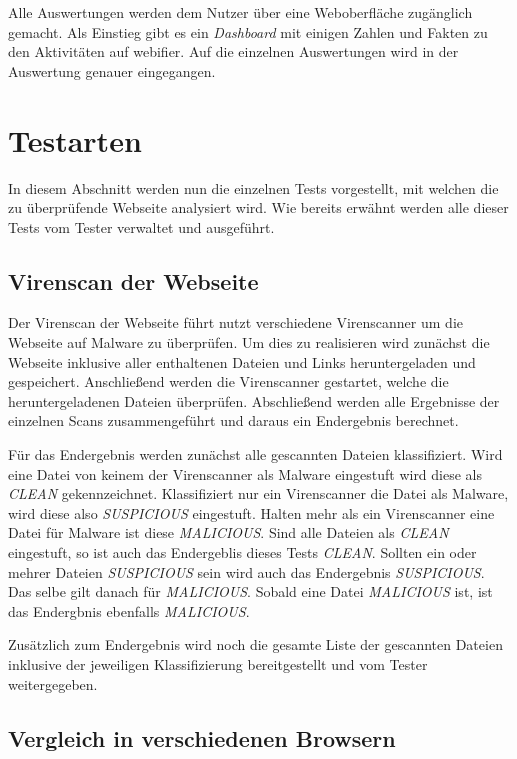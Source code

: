 Alle Auswertungen werden dem Nutzer über eine Weboberfläche zugänglich gemacht. Als Einstieg gibt es ein \textit{Dashboard} mit einigen Zahlen und Fakten zu den Aktivitäten auf webifier. Auf die einzelnen Auswertungen wird in der Auswertung genauer eingegangen.

\section{Testarten}
\label{sec:konzept-testarten}

In diesem Abschnitt werden nun die einzelnen Tests vorgestellt, mit welchen die zu überprüfende Webseite analysiert wird. Wie bereits erwähnt werden alle dieser Tests vom Tester verwaltet und ausgeführt.

\subsection{Virenscan der Webseite}

Der Virenscan der Webseite führt nutzt verschiedene Virenscanner um die Webseite auf Malware zu überprüfen. Um dies zu realisieren wird zunächst die Webseite inklusive aller enthaltenen Dateien und Links heruntergeladen und gespeichert. Anschließend werden die Virenscanner gestartet, welche die heruntergeladenen Dateien überprüfen. Abschließend werden alle Ergebnisse der einzelnen Scans zusammengeführt und daraus ein Endergebnis berechnet.

Für das Endergebnis werden zunächst alle gescannten Dateien klassifiziert. Wird eine Datei von keinem der Virenscanner als Malware eingestuft wird diese als \textit{CLEAN} gekennzeichnet. Klassifiziert nur ein Virenscanner die Datei als Malware, wird diese also \textit{SUSPICIOUS} eingestuft. Halten mehr als ein Virenscanner eine Datei für Malware ist diese \textit{MALICIOUS}. Sind alle Dateien als \textit{CLEAN} eingestuft, so ist auch das Endergeblis dieses Tests \textit{CLEAN}. Sollten ein oder mehrer Dateien \textit{SUSPICIOUS} sein wird auch das Endergebnis \textit{SUSPICIOUS}. Das selbe gilt danach für \textit{MALICIOUS}. Sobald eine Datei \textit{MALICIOUS} ist, ist das Endergbnis ebenfalls \textit{MALICIOUS}.

Zusätzlich zum Endergebnis wird noch die gesamte Liste der gescannten Dateien inklusive der jeweiligen Klassifizierung bereitgestellt und vom Tester weitergegeben.

\subsection{Vergleich in verschiedenen Browsern}

